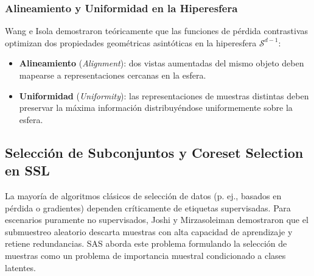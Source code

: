\subsubsection{Alineamiento y Uniformidad en la Hiperesfera}
Wang e Isola \cite{wang2020alignuniform} demostraron teóricamente que las funciones de pérdida contrastivas optimizan dos propiedades geométricas asintóticas en la hiperesfera $\mathcal{S}^{d-1}$:
\begin{itemize}
    \item \textbf{Alineamiento} (\textit{Alignment}): dos vistas aumentadas del mismo objeto deben mapearse a representaciones cercanas en la esfera.
    \item \textbf{Uniformidad} (\textit{Uniformity}): las representaciones de muestras distintas deben preservar la máxima información distribuyéndose uniformemente sobre la esfera.
\end{itemize}

\subsection{Selección de Subconjuntos y Coreset Selection en SSL}
La mayoría de algoritmos clásicos de selección de datos (p. ej., basados en pérdida o gradientes) dependen críticamente de etiquetas supervisadas. Para escenarios puramente no supervisados, Joshi y Mirzasoleiman \cite{joshi2023sas} demostraron que el submuestreo aleatorio descarta muestras con alta capacidad de aprendizaje y retiene redundancias. SAS aborda este problema formulando la selección de muestras como un problema de importancia muestral condicionado a clases latentes.
